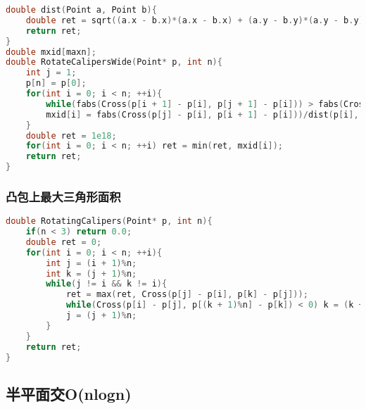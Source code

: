 \begin{lstlisting}[language=C++]   
double dist(Point a, Point b){
    double ret = sqrt((a.x - b.x)*(a.x - b.x) + (a.y - b.y)*(a.y - b.y));
    return ret;
}
double mxid[maxn];
double RotateCalipersWide(Point* p, int n){
    int j = 1;
    p[n] = p[0];
    for(int i = 0; i < n; ++i){
        while(fabs(Cross(p[i + 1] - p[i], p[j + 1] - p[i])) > fabs(Cross(p[i + 1] - p[i], p[j] - p[i]))) j = (j + 1)%n;
        mxid[i] = fabs(Cross(p[j] - p[i], p[i + 1] - p[i]))/dist(p[i], p[i + 1]);
    }
    double ret = 1e18;
    for(int i = 0; i < n; ++i) ret = min(ret, mxid[i]);
    return ret;
}
\end{lstlisting}

\subsubsection{凸包上最大三角形面积}

\begin{lstlisting}[language=C++]
double RotatingCalipers(Point* p, int n){
    if(n < 3) return 0.0;
    double ret = 0;
    for(int i = 0; i < n; ++i){
        int j = (i + 1)%n;
        int k = (j + 1)%n;
        while(j != i && k != i){
            ret = max(ret, Cross(p[j] - p[i], p[k] - p[j]));
            while(Cross(p[i] - p[j], p[(k + 1)%n] - p[k]) < 0) k = (k + 1)%n;
            j = (j + 1)%n;
        }
    }
    return ret;
}
\end{lstlisting}

\subsection{半平面交O(nlogn)}

